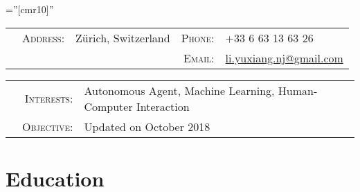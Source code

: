 \documentclass[a4paper,10pt]{article} %
\begin{document}
\pagestyle{empty} %

\font\fb=''[cmr10]'' %


\par{} %
\vspace{0.1cm}

\begin{tabular}{@{}p{0.67cm}rp{8.75cm}rl}
& \textsc{Address:} & Zürich, Switzerland & \textsc{Phone:} & +33 6 63 13 63 26 \\
& & & \textsc{Email:} & \href{mailto:li.yuxiang.nj@gmail.com}{li.yuxiang.nj@gmail.com}
\end{tabular}

\begin{tabular}{p{0.215cm}rl}
& \textsc{Interests:} & Autonomous Agent, Machine Learning, Human-Computer Interaction \\
& \textsc{Objective:} & Updated on October 2018
\end{tabular}


\section{Education}
\end{document}
